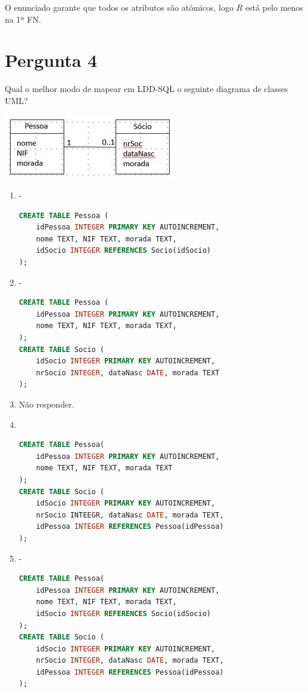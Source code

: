 {O enunciado garante que todos os atributos são atómicos, logo $R$ está pelo menos na 1ª FN.

\section{Pergunta 4} 
Qual o melhor modo de mapear em LDD-SQL o seguinte diagrama de classes UML?
\begin{center}
    \includegraphics[scale=0.6]{questions/2015N_02.png}
\end{center}
\begin{enumerate}[label=\alph*.]\itemsep0em
    \item - \\
    \begin{lstlisting}[language=SQL]
CREATE TABLE Pessoa (
    idPessoa INTEGER PRIMARY KEY AUTOINCREMENT,
    nome TEXT, NIF TEXT, morada TEXT,
    idSocio INTEGER REFERENCES Socio(idSocio)
);
    \end{lstlisting}
    \item - \\
    \begin{lstlisting}[language=SQL]
CREATE TABLE Pessoa (
    idPessoa INTEGER PRIMARY KEY AUTOINCREMENT,
    nome TEXT, NIF TEXT, morada TEXT,
);
CREATE TABLE Socio (
    idSocio INTEGER PRIMARY KEY AUTOINCREMENT,
    nrSocio INTEGER, dataNasc DATE, morada TEXT
);
    \end{lstlisting}
    \item Não responder.
    \item \textbf{\greencheckmark} \\
    \begin{lstlisting}[language=SQL]
CREATE TABLE Pessoa(
    idPessoa INTEGER PRIMARY KEY AUTOINCREMENT,
    nome TEXT, NIF TEXT, morada TEXT
);
CREATE TABLE Socio (
    idSocio INTEGER PRIMARY KEY AUTOINCREMENT,
    nrSocio INTEEGR, dataNasc DATE, morada TEXT,
    idPessoa INTEGER REFERENCES Pessoa(idPessoa)
);
    \end{lstlisting}
    \item - \\
    \begin{lstlisting}[language=SQL]
CREATE TABLE Pessoa(
    idPessoa INTEGER PRIMARY KEY AUTOINCREMENT,
    nome TEXT, NIF TEXT, morada TEXT,
    idSocio INTEGER REFERENCES Socio(idSocio)
);
CREATE TABLE Socio (
    idSocio INTEGER PRIMARY KEY AUTOINCREMENT,
    nrSocio INTEGER, dataNasc DATE, morada TEXT,
    idPessoa INTEGER REFERENCES Pessoa(idPessoa)
);
    \end{lstlisting}
\end{enumerate}

}
